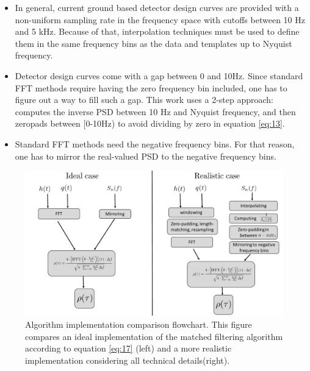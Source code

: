\begin{itemize}
\begin{itemize}
	\item In general, current ground based detector design curves are provided with a non-uniform sampling rate in the frequency space \cite{Reitze:2019dyk} with cutoffs between 10 Hz and 5 kHz. Because of that, interpolation techniques must be used to define them in the same frequency bins as the data and templates up to Nyquist frequency.
	\item Detector design curves come with a gap between 0 and 10Hz. Since standard FFT methods require having the zero frequency bin included, one has to figure out a way to fill such a gap. This work uses a 2-step approach: computes the inverse PSD between 10 Hz and Nyquist frequency, and then zeropads between [0-10Hz) to avoid dividing by zero in equation \ref{eq:13}.
	\item Standard FFT methods need the negative frequency bins. For that reason, one has to mirror the real-valued PSD to the negative frequency bins.
	\end{itemize}

\end{itemize}

\begin{figure}[hbt!]

\begin{center}

\includegraphics[width=\textwidth, angle=0]{images/comparison.pdf}
\captionsetup{width=0.8\textwidth}
\caption[Matched filtering algorithm: ideal vs realistic flowchart]{Algorithm implementation comparison flowchart. This figure compares an ideal implementation of the matched filtering algorithm according to equation \ref{eq:17} (left) and a more realistic implementation considering all technical details(right).}
\label{fig:8}
\end{center}
\end{figure}

\FloatBarrier














